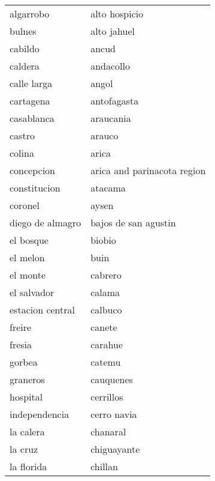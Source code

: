 \begin{longtable}{l|l}
                  algarrobo   &    alto hospicio   \\   
                   bulnes   &    alto jahuel   \\   
                   cabildo   &    ancud   \\   
                   caldera   &    andacollo   \\   
                   calle larga   &    angol   \\   
                   cartagena   &    antofagasta   \\   
                   casablanca   &    araucania   \\   
                   castro   &    arauco   \\   
                   colina   &    arica   \\   
                   concepcion   &    arica and parinacota region   \\   
                   constitucion   &    atacama   \\   
                   coronel   &    aysen   \\   
                   diego de almagro   &    bajos de san agustin   \\   
                   el bosque   &    biobio   \\   
                   el melon   &    buin   \\   
                   el monte   &    cabrero   \\   
                   el salvador   &    calama   \\   
                   estacion central   &    calbuco   \\   
                   freire   &    canete   \\   
                   fresia   &    carahue   \\   
                   gorbea   &    catemu   \\   
                   graneros   &    cauquenes   \\   
                   hospital   &    cerrillos   \\   
                   independencia   &    cerro navia   \\   
                   la calera   &    chanaral   \\   
                   la cruz   &    chiguayante   \\   
                   la florida   &    chillan   \\   

\end{longtable}
